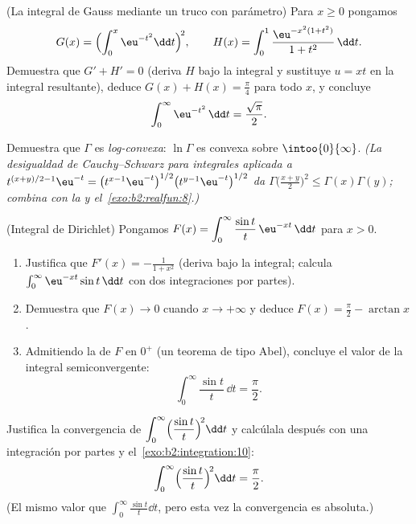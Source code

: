 \begin{exercise}[$\star\star\star$]\label{exo:b2:integration:8}
(La integral de Gauss mediante un truco con parámetro) Para $x \geq
0$ pongamos
\[
G(x) = \Bigl(\int_0^x \eu^{-t^2}\dd t\Bigr)^{\!2},
\qquad
H(x) = \int_0^1 \frac{\eu^{-x^2(1+t^2)}}{1 + t^2}\,\dd t .
\]
Demuestra que $G' + H' = 0$ (deriva $H$ bajo la integral y sustituye
$u = xt$ en la integral resultante), deduce $G(x) + H(x) =
\frac\pi4$ para todo $x$, y concluye
\[
\int_0^{\infty} \eu^{-t^2}\,\dd t = \frac{\sqrt\pi}{2} .
\]
\end{exercise}

\begin{exercise}[$\star\star\star$]\label{exo:b2:integration:9}
Demuestra que $\Gamma$ es \emph{log-convexa}: $\ln\Gamma$ es convexa
sobre $\intoo{0}{\infty}$. \emph{(La desigualdad de Cauchy--Schwarz
para integrales aplicada a $t^{(x+y)/2 - 1}\eu^{-t} =
\bigl(t^{x-1}\eu^{-t}\bigr)^{1/2} \bigl(t^{y-1}\eu^{-t}\bigr)^{1/2}$
da $\Gamma\bigl(\frac{x+y}{2}\bigr)^2 \leq \Gamma(x)\Gamma(y)$;
combina con la  y el~\cref{exo:b2:realfun:8}.)}
\end{exercise}

\begin{exercise}[$\star\star\star$]\label{exo:b2:integration:10}
(Integral de Dirichlet) Pongamos $F(x) = \displaystyle\int_0^{\infty}
\frac{\sin t}{t}\,\eu^{-xt}\,\dd t$ para $x > 0$.
\begin{enumerate}
  \item Justifica que $F'(x) = -\frac{1}{1 + x^2}$ (deriva bajo la
        integral; calcula $\int_0^\infty \eu^{-xt}\sin t\,\dd t$ con
        dos integraciones por partes).
  \item Demuestra que $F(x) \to 0$ cuando $x \to +\infty$ y deduce
        $F(x) = \frac\pi2 - \arctan x$.
  \item Admitiendo la  de $F$ en $0^+$ (un teorema de
        tipo Abel), concluye el valor de la integral
        semiconvergente:
        \[
        \int_0^{\infty} \frac{\sin t}{t}\,\dd t = \frac{\pi}{2}.
        \]
\end{enumerate}
\end{exercise}

\begin{exercise}[$\star\star$]\label{exo:b2:integration:11}
Justifica la convergencia de $\displaystyle\int_0^\infty
\Bigl(\frac{\sin t}{t}\Bigr)^{\!2}\dd t$ y calcúlala después con una
integración por partes y el~\cref{exo:b2:integration:10}:
\[
\int_0^\infty \Bigl(\frac{\sin t}{t}\Bigr)^{\!2}\dd t
= \frac{\pi}{2} .
\]
(El mismo valor que $\int_0^\infty \frac{\sin t}{t}\dd t$, pero esta
vez la convergencia es absoluta.)
\end{exercise}

